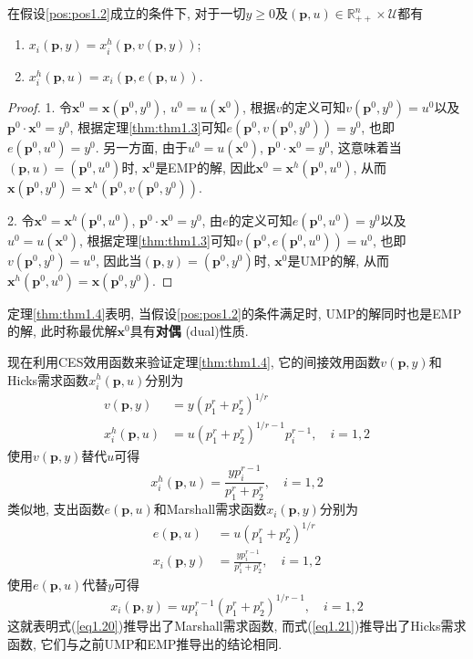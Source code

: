 \documentclass[cn, 12pt, math=mtpro2, bibstyle=apa, blue, twocol]{elegantbook}
\newcommand{\R}{\mathbb{R}}
\newcommand{\p}{\mathbf{p}}
\newcommand{\x}{\mathbf{x}}
\begin{document}
\begin{theorem}[对偶关系]\label{thm:thm1.4}
  在假设\ref{pos:pos1.2}成立的条件下, 对于一切$y\ge0$及$(\p,u)\in\R_{++}^n\times\mathcal{U}$都有
  \begin{enumerate}[label=\arabic*.]
    \item $x_i(\p,y)=x_i^h(\p,v(\p,y))$;
    \item $x_i^h(\p,u)=x_i(\p,e(\p,u))$.
  \end{enumerate}
\end{theorem}
\begin{proof}
  1. 令$\x^0=\x(\p^0,y^0)$, $u^0=u(\x^0)$, 根据$v$的定义可知$v(\p^0,y^0)=u^0$以及$\p^0\cdot\x^0=y^0$, 根据定理\ref{thm:thm1.3}可知$e(\p^0,v(\p^0,y^0))=y^0$, 也即$e(\p^0,u^0)=y^0$. 另一方面, 由于$u^0=u(\x^0)$, $\p^0\cdot\x^0=y^0$, 这意味着当$(\p,u)=(\p^0,u^0)$时, $\x^0$是EMP的解, 因此$\x^0=\x^h(\p^0,u^0)$, 从而$\x(\p^0,y^0)=\x^h(\p^0,v(\p^0,y^0))$.

  2. 令$\x^0=\x^h(\p^0,u^0)$, $\p^0\cdot\x^0=y^0$, 由$e$的定义可知$e(\p^0,u^0)=y^0$以及$u^0=u(\x^0)$, 根据定理\ref{thm:thm1.3}可知$v(\p^0,e(\p^0,u^0))=u^0$, 也即$v(\p^0,y^0)=u^0$, 因此当$(\p,y)=(\p^0,y^0)$时, $\x^0$是UMP的解, 从而$\x^h(\p^0,u^0)=\x(\p^0,y^0)$.
\end{proof}
定理\ref{thm:thm1.4}表明, 当假设\ref{pos:pos1.2}的条件满足时, UMP的解同时也是EMP的解, 此时称最优解$\x^0$具有\textbf{对偶} (dual)性质.
\begin{example}
现在利用CES效用函数来验证定理\ref{thm:thm1.4}, 它的间接效用函数$v(\p,y)$和Hicks需求函数$x_i^h(\p,u)$分别为
\begin{align*}
v(\p,y)&=y(p_1^r+p_2^r)^{1/r} \\
 x_i^h(\p,u)&=u(p_1^r+p_2^r)^{1/r-1}p_i^{r-1},\quad i=1,2
\end{align*}
使用$v(\p,y)$替代$u$可得
\begin{equation}\label{eq1.20}
  x_i^h(\p,u)=\frac{yp_i^{r-1}}{p_1^r+p_2^r},\quad i=1,2
\end{equation}
类似地, 支出函数$e(\p,u)$和Marshall需求函数$x_i(\p,y)$分别为
\begin{align*}
e(\p,u)&=u(p_1^r+p_2^r)^{1/r} \\
x_i(\p,y)&=\frac{yp_i^{r-1}}{p_1^r+p_2^r},\quad i=1,2
\end{align*}
使用$e(\p,u)$代替$y$可得
\begin{equation}\label{eq1.21}
  x_i(\p,y)=up_i^{r-1}(p_1^r+p_2^r)^{1/r-1},\quad i=1,2
\end{equation}
这就表明式(\ref{eq1.20})推导出了Marshall需求函数, 而式(\ref{eq1.21})推导出了Hicks需求函数, 它们与之前UMP和EMP推导出的结论相同.
\end{example}
\end{document}
